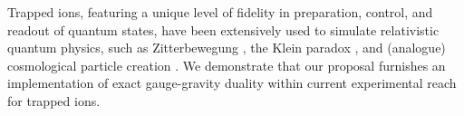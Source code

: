 \documentclass[prl,twocolumn,superscriptaddress,floatfix,showpacs,amsmath,longbibliography,nofootinbib,amssymb]{revtex4-1}
\newcommand{\colb}[1]{\textcolor{blue}{#1}}
\begin{document}
Trapped ions, featuring a unique level of fidelity in preparation, control, and readout of quantum states, have been extensively used to simulate relativistic quantum physics, 
such as Zitterbewegung \cite{PhysRevLett.98.253005, ZMD, PhysRevLett.120.160403}, the 
Klein paradox \cite{PhysRevLett.106.060503, PhysRevA.82.020101}, and (analogue) cosmological particle creation  
\cite{PhysRevLett.94.220401, PhysRevLett.99.201301, PhysRevLett.123.180502, Menicucci_2010}. 
We demonstrate that our proposal furnishes an implementation of exact 
gauge-gravity duality within current experimental reach for trapped ions. %
\end{document}
